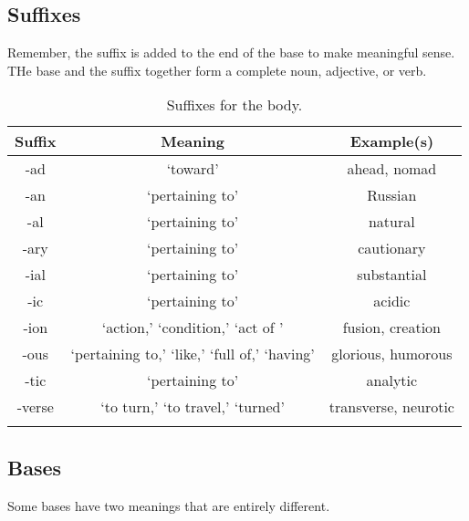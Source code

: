 \subsection{Suffixes}

Remember, the suffix is added to the end of the base to make meaningful sense. THe base and the suffix together form a complete noun, adjective, or verb.

\begin{longtable}{c | c | c}
    \caption{Suffixes for the body.}
    \hline 
    Suffix & Meaning & Example(s) \\ \hline
    -ad & `toward' & ahead, nomad \\
    -an & `pertaining to' & Russian \\
    -al & `pertaining to' & natural \\
    -ary & `pertaining to' & cautionary \\
    -ial & `pertaining to' & substantial \\
    -ic & `pertaining to' & acidic \\
    -ion & `action,' `condition,' `act of ' & fusion, creation \\
    -ous & `pertaining to,' `like,' `full of,' `having' & glorious, humorous \\
    -tic & `pertaining to' & analytic \\
    -verse & `to turn,' `to travel,' `turned' & transverse, neurotic \\
    \label{tab:Ch2Suffix}
\end{longtable}


\subsection{Bases}

Some bases have two meanings that are entirely different.

